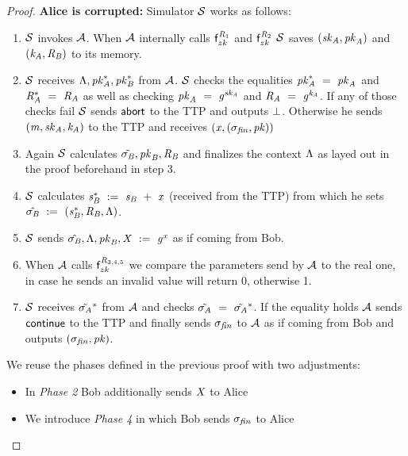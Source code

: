 \begin{proof}
    \textbf{Alice is corrupted: } Simulator $\mathcal{S}$ works as follows:
    \begin{enumerate}
        \item $\mathcal{S}$ invokes $\mathcal{A}$.
        When $\mathcal{A}$ internally calls $\mathsf{f}^{\mathit{R}_1}_{zk}$ and $\mathsf{f}^{\mathit{R}_2}_{zk}$ $\mathcal{S}$ saves $(\mathit{sk}_{\mathit{A}}, \mathit{pk}_{\mathit{A}})$ and $(\mathit{\mathit{k}_{\mathit{A}}}, \mathit{R}_{\mathit{B}})$ to its memory.
        \item $\mathcal{S}$ receives $\Lambda, \mathit{pk}_{\mathit{A}}^*, \mathit{pk}_{\mathit{B}}^*$ from $\mathcal{A}$.
        $\mathcal{S}$ checks the equalities $\mathit{pk}_{\mathit{A}}^* ~=~ \mathit{pk}_{\mathit{A}}$ and $\mathit{R}_{\mathit{A}}^* ~=~ \mathit{R}_{\mathit{A}}$ as well as checking $\mathit{pk}_{\mathit{A}} ~=~ \mathit{g}^{\mathit{sk}_{\mathit{A}}}$ and $\mathit{R}_{\mathit{A}} ~=~ \mathit{g}^{\mathit{\mathit{k}_{\mathit{A}}}}$.
        If any of those checks fail $\mathcal{S}$ sends $\mathsf{abort}$ to the TTP and outputs $\bot$.
        Otherwise he sends $(\mathit{m}, \mathit{sk}_{\mathit{A}}, \mathit{\mathit{k}_{\mathit{A}}})$ to the TTP and receives $(\mathit{x}, (\sigma_{\mathit{fin}}, \mathit{pk}))$
        \item Again $\mathcal{S}$ calculates $\tilde{\sigma_{\mathit{B}}}, \mathit{pk}_{\mathit{B}}, \mathit{R}_{\mathit{B}}$ and finalizes the context $\Lambda$ as layed out in the proof beforehand in step 3.
        \item $\mathcal{S}$ calculates $\mathit{s}_{\mathit{B}}^* ~:=~ \mathit{s}_{\mathit{B}} ~+~ \mathit{x}$ (received from the TTP) from which he sets $\hat{\sigma_{\mathit{B}}} ~:=~ (\mathit{s}_{\mathit{B}}^*, \mathit{R}_{\mathit{B}}, \Lambda)$.
        \item $\mathcal{S}$ sends $\hat{\sigma_{\mathit{B}}}, \Lambda, \mathit{pk}_{\mathit{B}}, \mathit{X} ~:=~ \mathit{g}^{\mathit{x}}$ as if coming from Bob.
        \item When $\mathcal{A}$ calls $\mathsf{f}^{\mathit{R}_{3,4,5}}_{zk}$ we compare the parameters send by $\mathcal{A}$ to the real one, in case he sends an invalid value will return 0, otherwise 1.
        \item $\mathcal{S}$ receives $\tilde{\sigma_{\mathit{A}}}^*$ from $\mathcal{A}$ and checks $\tilde{\sigma_{\mathit{A}}} ~=~ \tilde{\sigma_{\mathit{A}}}^*$.
        If the equality holds $\mathcal{A}$ sends $\mathsf{continue}$ to the TTP and finally sends $\sigma_{\mathit{fin}}$ to $\mathcal{A}$ as if coming from Bob and outputs $(\sigma_{\mathit{fin}}, \mathit{pk})$.
    \end{enumerate}

    We reuse the phases defined in the previous proof with two adjustments:
    \begin{itemize}
        \item In \textit{Phase 2} Bob additionally sends $\mathit{X}$ to Alice
        \item We introduce \textit{Phase 4} in which Bob sends $\sigma_{\mathit{fin}}$ to Alice
    \end{itemize}


\end{proof}
